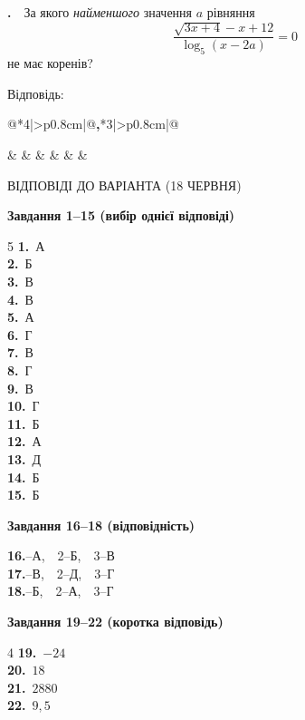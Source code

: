 \documentclass[12pt]{article}
\makeatletter
\newcommand{\sectionTitle}[1]{%
\par\vspace{0.4cm}
\begin{tcolorbox}[colback=titleBg, colframe=titleBg, boxrule=0pt, arc=8pt, halign=center, fontupper=\Large\bfseries\color{mainGreen}]
#1
\end{tcolorbox}\par\vspace{0.3cm}}
\newcommand{\nmtAnswerBox}{%
\par\vspace{0.2cm}\noindent
Відповідь:\ \ 
\begin{tabular}{@{}*{4}{|>{\centering\arraybackslash}p{0.8cm}}|@{\hspace{0.1cm}\textbf{,}\hspace{0.1cm}}*{3}{|>{\centering\arraybackslash}p{0.8cm}}|@{}}
\hline
\rule[-0.2cm]{0pt}{0.7cm} & & & & & & \\
\hline
\end{tabular}
\par\vspace{0.3cm}}
\newcounter{zad}
\newcommand{\zadtask}[1]{\stepcounter{zad}\par\vspace{0.3cm}\noindent\textbf{\thezad.}\ \ #1\par\vspace{0.2cm}}
\makeatother
\begin{document}
\zadtask{За якого \textit{найменшого} значення $a$ рівняння
\[
\dfrac{\sqrt{3x + 4} - x + 12}{\log_5(x - 2a)} = 0
\]
не має коренів?}
\nmtAnswerBox

\newpage
\sectionTitle{ВІДПОВІДІ ДО ВАРІАНТА (18 ЧЕРВНЯ)}

\noindent\textbf{\large Завдання 1--15 (вибір однієї відповіді)}
\par\vspace{0.2cm}
\begin{multicols}{5}
\noindent
\textbf{1.}~А\\
\textbf{2.}~Б\\
\textbf{3.}~В\\
\textbf{4.}~В\\
\textbf{5.}~А\\
\textbf{6.}~Г\\
\textbf{7.}~В\\
\textbf{8.}~Г\\
\textbf{9.}~В\\
\textbf{10.}~Г\\
\textbf{11.}~Б\\
\textbf{12.}~А\\
\textbf{13.}~Д\\
\textbf{14.}~Б\\
\textbf{15.}~Б
\end{multicols}

\par\vspace{0.3cm}
\noindent\textbf{\large Завдання 16--18 (відповідність)}
\par\vspace{0.2cm}
\noindent
\textbf{16.}--А,\ \ 2--Б,\ \ 3--В\\[0.15cm]
\textbf{17.}--В,\ \ 2--Д,\ \ 3--Г\\[0.15cm]
\textbf{18.}\quad 1--Б,\ \ 2--А,\ \ 3--Г

\par\vspace{0.3cm}
\noindent\textbf{\large Завдання 19--22 (коротка відповідь)}
\par\vspace{0.2cm}
\begin{multicols}{4}
\noindent
\textbf{19.}~$-24$\\
\textbf{20.}~$18$\\
\textbf{21.}~$2880$\\
\textbf{22.}~$9{,}5$
\end{multicols}
\end{document}
